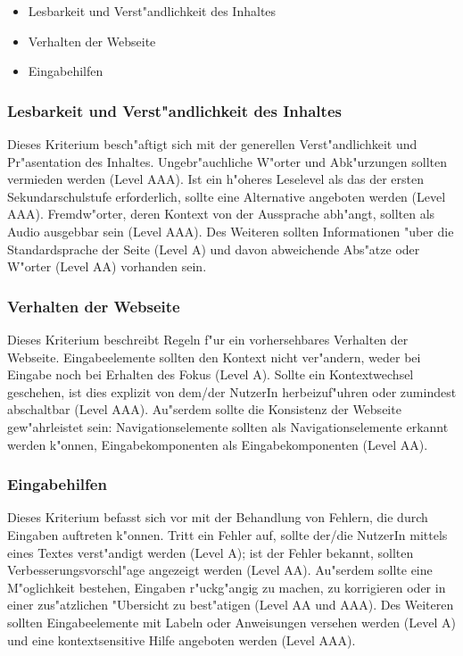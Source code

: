 \documentclass[a4paper,bibtotoc,oneside]{scrbook}
\begin{document}
\begin{itemize}
\item Lesbarkeit und Verst"andlichkeit des Inhaltes \cite[Abschnitt 3.1]{wcag2}
\item Verhalten der Webseite \cite[Abschnitt 3.2]{wcag2}
\item Eingabehilfen \cite[Abschnitt 3.3]{wcag2}
\end{itemize}

\subsubsection{Lesbarkeit und Verst"andlichkeit des Inhaltes}
Dieses Kriterium besch"aftigt sich mit der generellen Verst"andlichkeit und Pr"asentation des Inhaltes. Ungebr"auchliche W"orter und Abk"urzungen sollten vermieden werden (Level AAA). Ist ein h"oheres Leselevel als das der ersten Sekundarschulstufe erforderlich, sollte eine Alternative angeboten werden (Level AAA). Fremdw"orter, deren Kontext von der Aussprache abh"angt, sollten als Audio ausgebbar sein (Level AAA). Des Weiteren sollten Informationen "uber die Standardsprache der Seite (Level A) und davon abweichende Abs"atze oder W"orter (Level AA) vorhanden sein. \cite[Abschnitt 3.1]{wcag2}

\subsubsection{Verhalten der Webseite}
Dieses Kriterium beschreibt Regeln f"ur ein vorhersehbares Verhalten der Webseite. Eingabeelemente sollten den Kontext nicht ver"andern, weder bei Eingabe noch bei Erhalten des Fokus (Level A). Sollte ein Kontextwechsel geschehen, ist dies explizit von dem/der NutzerIn herbeizuf"uhren oder zumindest abschaltbar (Level AAA). Au"serdem sollte die Konsistenz der Webseite gew"ahrleistet sein: Navigationselemente sollten als Navigationselemente erkannt werden k"onnen, Eingabekomponenten als Eingabekomponenten (Level AA). \cite[Abschnitt 3.2]{wcag2}

\subsubsection{Eingabehilfen}
Dieses Kriterium befasst sich vor mit der Behandlung von Fehlern, die durch Eingaben auftreten k"onnen. Tritt ein Fehler auf, sollte der/die NutzerIn mittels eines Textes verst"andigt werden (Level A); ist der Fehler bekannt, sollten Verbesserungsvorschl"age angezeigt werden (Level AA). Au"serdem sollte eine M"oglichkeit bestehen, Eingaben r"uckg"angig zu machen, zu korrigieren oder in einer zus"atzlichen "Ubersicht zu best"atigen (Level AA und AAA). Des Weiteren sollten Eingabeelemente mit Labeln oder Anweisungen versehen werden (Level A) und eine kontextsensitive Hilfe angeboten werden (Level AAA). \cite[Abschnitt 3.3]{wcag2}
\end{document}
